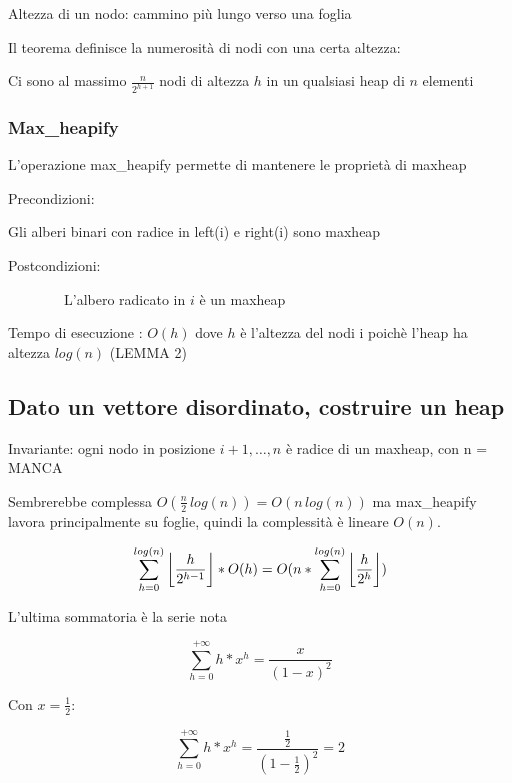 \documentclass[tikz]{article}
\DeclarePairedDelimiter\floor{\lfloor}{\rfloor}
\begin{document}
{{{{Altezza di un nodo: cammino più lungo verso una foglia}

{Il teorema definisce la numerosità di nodi con una certa altezza:}

{Ci sono al massimo $\frac{n}{2^{h+1}}$ nodi di altezza $h$ in
un qualsiasi heap di $n$ elementi}

\subsubsection{Max\_heapify}}}

{L'operazione max\_heapify permette di mantenere le proprietà di maxheap}

{Precondizioni:}

{Gli alberi binari con radice in left(i) e right(i) sono maxheap}

{Postcondizioni:}

{~~~~~~~~L'albero radicato in $i$ è un maxheap}



{Tempo di esecuzione : $O(h)$ dove $h$ è l'altezza del nodi i poichè l'heap ha altezza $log(n)$ (LEMMA 2)}

\subsection{Dato un vettore disordinato, costruire un heap}



{Invariante: ogni nodo in posizione $i+1,\ldots,n$ è radice di un maxheap, con n = MANCA}

{Sembrerebbe complessa $O(\frac{n}{2}\,log(n)) = O(n\,log(n))$ ma max\_heapify lavora principalmente su foglie, quindi la complessità è lineare $O(n)$.}

\begin{equation}
\sum_{h=0}^{log(n)}{\floor*{\frac{h}{2^{h-1}}}*O(h)} = O(n*\sum_{h=0}^{log(n)}{\floor*{\frac{h}{2^h}})}
\end{equation}

{L'ultima sommatoria è la serie nota}

\begin{equation}
\sum_{h=0}^{+\infty}{h*x^h} = \frac{x}{{(1-x)}^2}
\end{equation}

{Con $x=\frac{1}{2}$:}

\begin{equation}
\sum_{h=0}^{+\infty}{h*x^h} = \frac{\frac{1}{2}}{{(1-\frac{1}{2})}^2} = 2
\end{equation}

}
\end{document}
